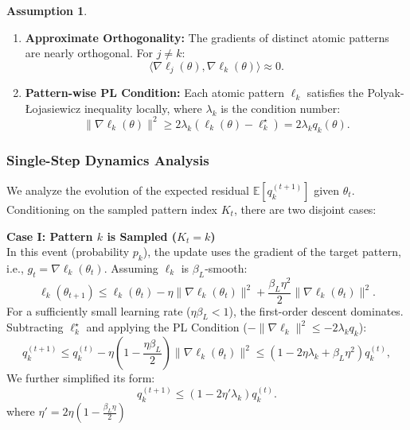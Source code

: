 \documentclass{article}
\theoremstyle{plain}
\theoremstyle{definition}
\newtheorem{assumption}[theorem]{Assumption}
\theoremstyle{remark}
\begin{document}
\begin{assumption}
\label{assump:optimization_geometry_app}

\begin{enumerate}
    \item \textbf{Approximate Orthogonality:} The gradients of distinct atomic patterns are nearly orthogonal. For $j \neq k$:
    \begin{equation*}
        \langle \nabla \ell_j(\theta), \nabla \ell_k(\theta) \rangle \approx 0.
    \end{equation*}
    \item \textbf{Pattern-wise PL Condition:} Each atomic pattern $\ell_k$ satisfies the Polyak-Łojasiewicz inequality locally, where $\lambda_k$ is the condition number:
    \begin{equation*}
        \|\nabla \ell_k(\theta)\|^2 \ge 2\lambda_k (\ell_k(\theta) - \ell_k^\star) = 2\lambda_k q_k(\theta).
    \end{equation*}
\end{enumerate}
\end{assumption}

\subsubsection{Single-Step Dynamics Analysis}

We analyze the evolution of the expected residual $\mathbb{E}[q_k^{(t+1)}]$ given $\theta_t$. Conditioning on the sampled pattern index $K_t$, there are two disjoint cases:

\textbf{Case I: Pattern $k$ is Sampled ($K_t = k$)} \\
In this event (probability $p_k$), the update uses the gradient of the target pattern, i.e., $g_t = \nabla \ell_k(\theta_t)$. Assuming $\ell_k$ is $\beta_L$-smooth:
\begin{equation*}
    \ell_k(\theta_{t+1}) \le \ell_k(\theta_t) - \eta \|\nabla \ell_k(\theta_t)\|^2 + \frac{\beta_L \eta^2}{2} \|\nabla \ell_k(\theta_t)\|^2.
\end{equation*}
For a sufficiently small learning rate ($\eta \beta_L < 1$), the first-order descent dominates. Subtracting $\ell_k^\star$ and applying the PL Condition ($-\|\nabla \ell_k\|^2 \le -2\lambda_k q_k$):
\begin{equation*}
    q_k^{(t+1)} \le q_k^{(t)} - \eta (1 - \frac{\eta \beta_L}{2}) \|\nabla \ell_k(\theta_t)\|^2 \le (1 - 2\eta \lambda_k + \beta_L \eta^2) q_k^{(t)},
\end{equation*}
We further simplified its form:
\begin{equation*}
    q_k^{(t+1)} \le (1 - 2\eta' \lambda_k) q_k^{(t)}.
\end{equation*}
where $\eta' = 2\eta \left(1 - \frac{\beta_L\eta}{2}\right)$
\end{document}

